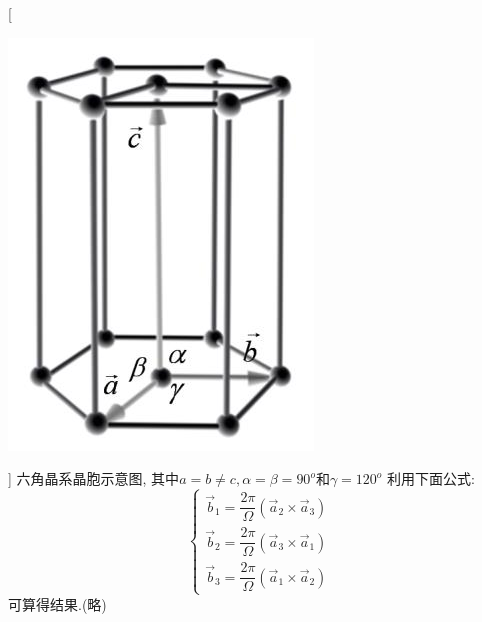 \documentclass[UTF8,12pt, a4paper, oneside]{ctexart}
\begin{document}
        [\begin{center}
            \includegraphics{picture/3-5.png}
        \end{center}]
       {六角晶系晶胞示意图, 其中$a=b\ne c ,\alpha=\beta=90^o$和$\gamma=120^o$
        利用下面公式:
        \begin{equation}
            \left\{\begin{array}{l}
            \vec{b}_{1}=\dfrac{2 \pi}{\Omega}\left(\vec{a}_{2} \times \vec{a}_{3}\right) \\
            \vec{b}_{2}=\dfrac{2 \pi}{\Omega}\left(\vec{a}_{3} \times \vec{a}_{1}\right)  \\
            \vec{b}_{3}=\dfrac{2 \pi}{\Omega}\left(\vec{a}_{1} \times \vec{a}_{2}\right)
            \end{array}\right.
            \tag{3.5.1} \label{351}
        \end{equation}
        可算得结果.(略)}
\end{document}
